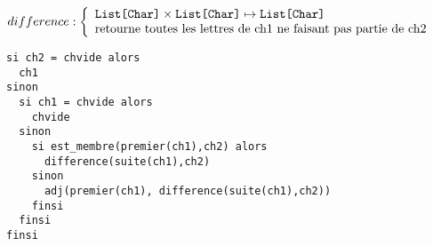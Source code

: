 \documentclass[10pt]{article}\usepackage[nu]{esial}
\begin{document}
\begin{Question}
  $difference: \left\{
    \begin{array}{l}
      \text{\texttt{List[Char]}}\times \text{\texttt{List[Char]}}\mapsto \text{\texttt{List[Char]}}\\
      \text{retourne toutes les lettres de ch1 ne faisant
        pas partie de ch2}
    \end{array}\right.$    
\end{Question}
\begin{Reponse}
  \begin{Verbatim}[label=difference(ch1\quotesinglbase ch2)]
si ch2 = chvide alors
  ch1
sinon 
  si ch1 = chvide alors
    chvide
  sinon
    si est_membre(premier(ch1),ch2) alors
      difference(suite(ch1),ch2)
    sinon
      adj(premier(ch1), difference(suite(ch1),ch2))
    finsi
  finsi
finsi    
  \end{Verbatim}
\end{Reponse}
\end{document}
